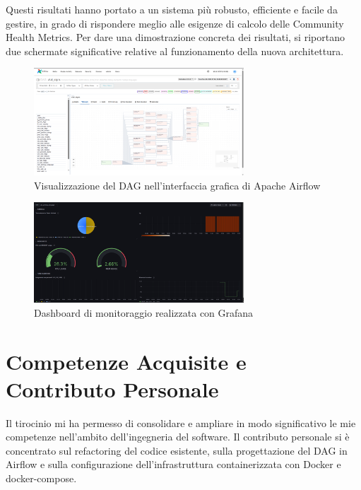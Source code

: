 Questi risultati hanno portato a un sistema più robusto, efficiente e facile da gestire, in grado di rispondere meglio alle esigenze di calcolo delle Community Health Metrics.
Per dare una dimostrazione concreta dei risultati, si riportano due schermate significative 
relative al funzionamento della nuova architettura.

\begin{figure}[h]
    \centering
    \includegraphics[width=0.7\textwidth]{img/airflowscreen.png}
    \caption{Visualizzazione del DAG nell'interfaccia grafica di Apache Airflow}
    \label{fig:airflowscreen}
\end{figure}

\begin{figure}[h]
    \centering
    \includegraphics[width=0.7\textwidth]{img/grafanadash.png}
    \caption{Dashboard di monitoraggio realizzata con Grafana}
    \label{fig:grafanadash}
\end{figure}

\newpage


\section{Competenze Acquisite e Contributo Personale}
\label{sec:competenzeacquisitecontributopersonale}

Il tirocinio mi ha permesso di consolidare e ampliare in modo significativo le mie competenze 
nell’ambito dell’ingegneria del software. Il contributo personale si è concentrato sul refactoring 
del codice esistente, sulla progettazione del DAG in Airflow e sulla configurazione dell’infrastruttura 
containerizzata con Docker e docker-compose. 

